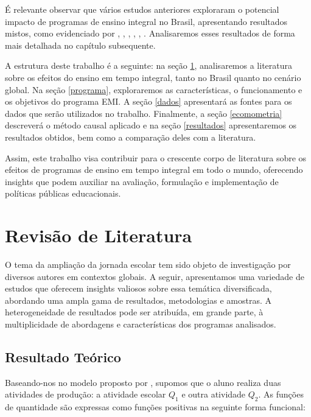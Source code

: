É relevante observar que vários estudos anteriores exploraram o potencial impacto de programas de ensino integral no Brasil, apresentando resultados mistos, como evidenciado por \cite{Oliveira_2008}, \cite{Almeida_2016}, \cite{Pereira_2011}, \cite{Filho_2012}, \cite{Xerxenevsky_2012}, \cite{Oliveira_2018} \cite{Kawahara_2019}. Analisaremos esses resultados de forma mais detalhada no capítulo subsequente.

A estrutura deste trabalho é a seguinte: na seção \ref{revisao}, analisaremos a literatura sobre os efeitos do ensino em tempo integral, tanto no Brasil quanto no cenário global. Na seção \ref{programa}, exploraremos as características, o funcionamento e os objetivos do programa EMI. A seção \ref{dados} apresentará as fontes para os dados que serão utilizados no trabalho. Finalmente, a seção \ref{ecomometria} descreverá o método causal aplicado e na seção \ref{resultados} apresentaremos os resultados obtidos, bem como a comparação deles com a literatura.

Assim, este trabalho visa contribuir para o crescente corpo de literatura sobre os efeitos de programas de ensino em tempo integral em todo o mundo, oferecendo insights que podem auxiliar na avaliação, formulação e implementação de políticas públicas educacionais.

\chapter{Revisão de Literatura} \label{revisao}

O tema da ampliação da jornada escolar tem sido objeto de investigação por diversos autores em contextos globais. A seguir, apresentamos uma variedade de estudos que oferecem insights valiosos sobre essa temática diversificada, abordando uma ampla gama de resultados, metodologias e amostras. A heterogeneidade de resultados pode ser atribuída, em grande parte, à multiplicidade de abordagens e características dos programas analisados.

\section{Resultado Teórico} \label{teoria}

Baseando-nos no modelo proposto por \cite{Levin_1987}, supomos que o aluno realiza duas atividades de produção: a atividade escolar \(Q_1\) e outra atividade \(Q_2\). As funções de quantidade são expressas como funções positivas na seguinte forma funcional:


